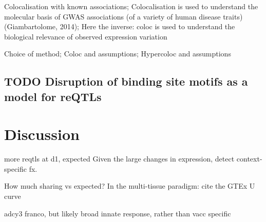 Colocalisation with known associations;
Colocalisation is used to understand the molecular basis of GWAS associations (of a variety of human disease traits) (Giambartolome, 2014);
Here the inverse: coloc is used to understand the biological relevance of observed expression variation

Choice of method; 
Coloc and assumptions; Hypercoloc and assumptions

\subsection{TODO Disruption of binding site motifs as a model for reQTLs}

\section{Discussion}

more reqtls at d1, expected
Given the large changes in expression, detect context-specific fx.




How much sharing vs expected?
In the multi-tissue paradigm: cite the GTEx U curve

adcy3
franco, but
likely broad innate response, rather than vacc specific

%

